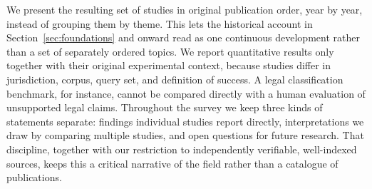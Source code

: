 We present the resulting set of studies in original publication order, year by year, instead of
grouping them by theme. This lets the historical account in Section~\ref{sec:foundations} and onward read as one
continuous development rather than a set of separately ordered topics. We report quantitative
results only together with their original experimental context, because studies differ in
jurisdiction, corpus, query set, and definition of success. A legal classification benchmark, for
instance, cannot be compared directly with a human evaluation of unsupported legal claims. Throughout
the survey we keep three kinds of statements separate: findings individual studies report directly,
interpretations we draw by comparing multiple studies, and open questions for future research. That
discipline, together with our restriction to independently verifiable, well-indexed sources, keeps
this a critical narrative of the field rather than a catalogue of publications.
